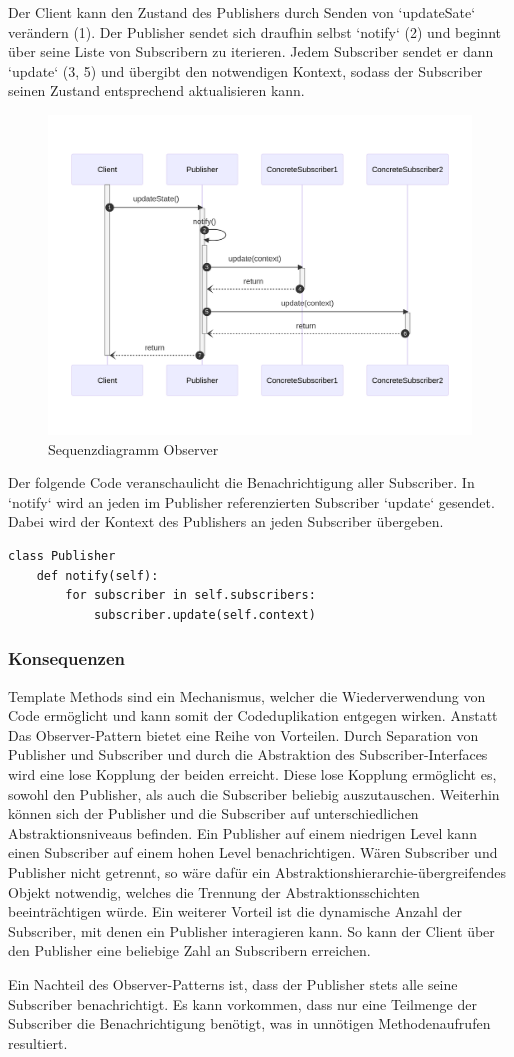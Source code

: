 Der Client kann den Zustand des Publishers durch Senden von `updateSate` verändern (1). Der Publisher sendet sich draufhin selbst `notify` (2) und beginnt über seine Liste von Subscribern zu iterieren. Jedem Subscriber sendet er dann `update` (3, 5) und übergibt den notwendigen Kontext, sodass der Subscriber seinen Zustand entsprechend aktualisieren kann. 

\begin{figure}[!hb]
	\centering
	\includegraphics[width=0.75\linewidth]{images/patterns/observer-seq.png}
	\caption{Sequenzdiagramm Observer}
	\label{fig:observer-seq}
\end{figure}

Der folgende Code veranschaulicht die Benachrichtigung aller Subscriber. In `notify` wird an jeden im Publisher referenzierten Subscriber `update` gesendet. Dabei wird der Kontext des Publishers an jeden Subscriber übergeben.

\lstset{language=python}
\begin{lstlisting}[caption={Quelltextunterschrift}, label=code:template-method-code]
class Publisher
	def notify(self):
        for subscriber in self.subscribers:
            subscriber.update(self.context)
\end{lstlisting}


\subsubsection*{Konsequenzen}

Template Methods sind ein Mechanismus, welcher die Wiederverwendung von Code ermöglicht und kann somit der Codeduplikation entgegen wirken. Anstatt Das Observer-Pattern bietet eine Reihe von Vorteilen. Durch Separation von Publisher und Subscriber und durch die Abstraktion des Subscriber-Interfaces wird eine lose Kopplung der beiden erreicht. Diese lose Kopplung ermöglicht es, sowohl den Publisher, als auch die Subscriber beliebig auszutauschen. Weiterhin können sich der Publisher und die Subscriber auf unterschiedlichen Abstraktionsniveaus befinden. Ein Publisher auf einem niedrigen Level kann einen Subscriber auf einem hohen Level benachrichtigen. Wären Subscriber und Publisher nicht getrennt, so wäre dafür ein Abstraktionshierarchie-übergreifendes Objekt notwendig, welches die Trennung der Abstraktionsschichten beeinträchtigen würde. Ein weiterer Vorteil ist die dynamische Anzahl der Subscriber, mit denen ein Publisher interagieren kann. So kann der Client über den Publisher eine beliebige Zahl an Subscribern erreichen.

Ein Nachteil des Observer-Patterns ist, dass der Publisher stets alle seine Subscriber benachrichtigt. Es kann vorkommen, dass nur eine Teilmenge der Subscriber die Benachrichtigung benötigt, was in unnötigen Methodenaufrufen resultiert.